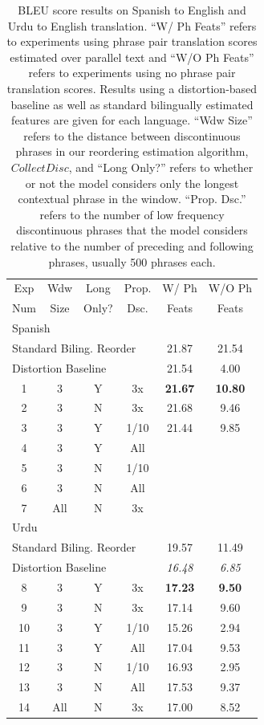 \documentclass[11pt,letterpaper]{article}
\begin{document}
\begin{table}[t]
\begin{small}
\begin{center}
\begin{tabular}{|c|c|c|c|c|c|}
\hline
Exp & Wdw & Long & Prop.  & W/ Ph & W/O Ph \\
Num & Size & Only? &  Dsc. & Feats  & Feats \\
\hline
\multicolumn{6}{|l|}{Spanish} \\
\hline
\multicolumn{4}{|l|}{Standard Biling. Reorder} & 21.87 & 21.54 \\ 
\hline
\multicolumn{4}{|l|}{Distortion Baseline} & 21.54 & 4.00 \\ 
\hline
1 & 3 & Y & 3x & {\bf 21.67} & {\bf 10.80} \\
\hline
2 & 3 & N & 3x & 21.68 & 9.46 \\
3 & 3 & Y & 1/10 & 21.44 & 9.85 \\
4 & 3 & Y & All &  &  \\
5& 3 & N & 1/10 &  &  \\
6& 3 & N & All &  &  \\
7& All & N & 3x &  &  \\
\hline
\hline
\multicolumn{6}{|l|}{Urdu} \\
\hline
\multicolumn{4}{|l|}{Standard Biling. Reorder} & 19.57 & 11.49 \\ 
\hline
\multicolumn{4}{|l|}{Distortion Baseline} & {\it 16.48} & {\it 6.85} \\ %
\hline
8 & 3 & Y & 3x & {\bf 17.23} & {\bf 9.50} \\
\hline
9 & 3 & N & 3x & 17.14 & 9.60 \\
10 & 3 & Y & 1/10 & 15.26 & 2.94 \\
11 & 3 & Y & All & 17.04 & 9.53 \\
12 & 3 & N & 1/10 & 16.93 & 2.95 \\
13 & 3 & N & All & 17.53 & 9.37 \\
14 & All & N & 3x & 17.00 & 8.52 \\
\hline
\end{tabular}
\end{center}
\vskip -0.1in
\caption{\label{bleu-table}BLEU score results on Spanish to English and Urdu to English translation. ``W/ Ph Feats'' refers to experiments using phrase pair translation scores estimated over parallel text and ``W/O Ph Feats'' refers to experiments using no phrase pair translation scores. Results using a distortion-based baseline as well as standard bilingually estimated features are given for each language. ``Wdw Size'' refers to the distance between discontinuous phrases in our reordering estimation algorithm, $CollectDisc$, and ``Long Only?'' refers to whether or not the model considers only the longest contextual phrase in the window. ``Prop. Dsc.'' refers to the number of low frequency discontinuous phrases that the model considers relative to the number of preceding and following phrases, usually 500 phrases each.}
\vskip -0.15in
\end{small}
\end{table}
\end{document}
